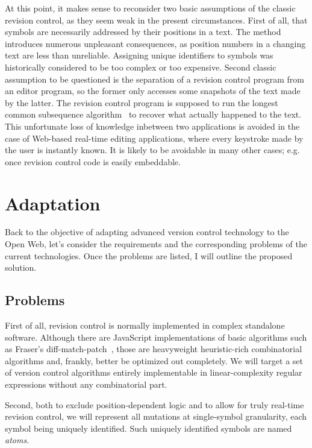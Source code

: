 \documentclass{acm_proc_article-sp}
\begin{document}
At this point, it makes sense to reconsider two basic
assumptions of the classic revision control, as they seem weak
in the present circumstances. First of all, that symbols are
necessarily
addressed by their positions in a text. The method introduces
numerous unpleasant consequences, as position numbers
in a changing text are less than unreliable. 
Assigning unique identifiers to symbols was historically
considered to be too complex or too expensive.
Second classic assumption to be questioned is the
separation of a revision control program from an
editor program, so the former only accesses some snapshots
of the text made by the latter.
The revision control program is supposed to
run the longest common subsequence algorithm~\cite{lcs-algo} to
recover what actually happened to the text.
This unfortunate loss of knowledge inbetween two
applications is avoided in the
case of Web-based real-time editing applications, where
every keystroke made by the user is instantly known.
It is likely to be avoidable in many other cases;
e.g. once revision control code is easily embeddable.


\section {Adaptation}   \label{sec:textile}

Back to the objective of adapting advanced version
control technology to the Open Web, let's consider the
requirements and the corresponding problems of the
current technologies. Once the problems are listed, I
will outline the proposed solution.

\subsection {Problems}
First of all, revision control is normally implemented
in complex standalone software. Although there are JavaScript
implementations of basic algorithms such as Fraser's
diff-match-patch~\cite{diff-match-patch}, those are
heavyweight heuristic-rich combinatorial
algorithms and, frankly, better be optimized out
completely. We will target a set of version control
algorithms entirely implementable in 
linear-complexity regular
expressions without any combinatorial part.

Second, both to exclude position-dependent logic and
to allow for truly real-time revision control, we will
represent all mutations at single-symbol granularity,
each symbol being uniquely identified. Such uniquely
identified symbols are named \emph{atoms}.
\end{document}
